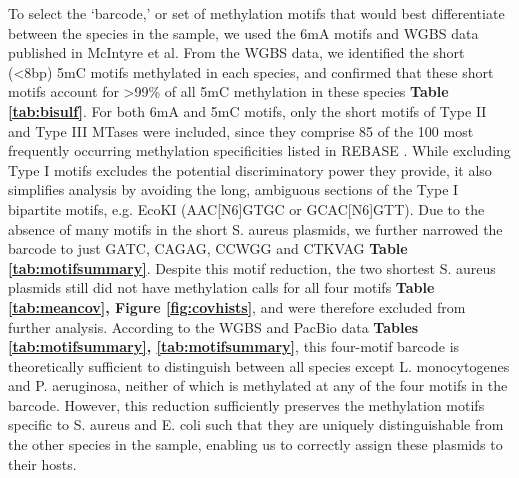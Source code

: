 To select the ‘barcode,’ or set of methylation motifs that would best differentiate between the species in the sample, we used the 6mA motifs and WGBS data published in McIntyre \citep{McIntyre2017-ed} et al. From the WGBS data, we identified the short (<8bp) 5mC motifs methylated in each species, and confirmed that these short motifs account for >99\% of all 5mC methylation in these species {\bf Table \ref{tab:bisulf}}. For both 6mA and 5mC motifs, only the short motifs of Type II and Type III MTases were included, since they comprise 85 of the 100 most frequently occurring methylation specificities listed in REBASE \citep{Roberts2003-ss}. While excluding Type I motifs excludes the potential discriminatory power they provide, it also simplifies analysis by avoiding the long, ambiguous sections of the Type I bipartite motifs, e.g. EcoKI (AAC[N6]GTGC or GCAC[N6]GTT). Due to the absence of many motifs in the short S. aureus plasmids, we further narrowed the barcode to just GATC, CAGAG, CCWGG and CTKVAG {\bf Table \ref{tab:motifsummary}}. Despite this motif reduction, the two shortest S. aureus plasmids still did not have methylation calls for all four motifs {\bf Table \ref{tab:meancov}, Figure \ref{fig:covhists}}, and were therefore excluded from further analysis. According to the WGBS and PacBio data \citep{McIntyre2017-ed} {\bf Tables \ref{tab:motifsummary}, \ref{tab:motifsummary}}, this four-motif barcode is theoretically sufficient to distinguish between all species except L. monocytogenes and P. aeruginosa, neither of which is methylated at any of the four motifs in the barcode. However, this reduction sufficiently preserves the methylation motifs specific to S. aureus and E. coli such that they are uniquely distinguishable from the other species in the sample, enabling us to correctly assign these plasmids to their hosts.


